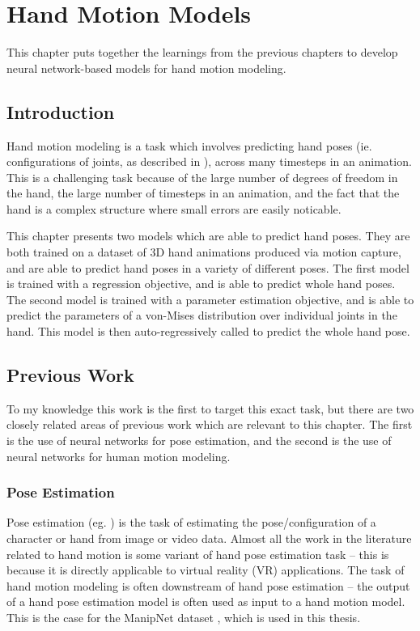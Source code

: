 \chapter{Hand Motion Models}
\label{C:hand-model}

This chapter puts together the learnings from the previous chapters to develop neural network-based models for hand motion modeling.

\section{Introduction}

Hand motion modeling is a task which involves predicting hand poses (ie. configurations of joints, as described in ), across many timesteps in an animation. This is a challenging task because of the large number of degrees of freedom in the hand, the large number of timesteps in an animation, and the fact that the hand is a complex structure where small errors are easily noticable.

This chapter presents two models which are able to predict hand poses. They are both trained on a dataset of 3D hand animations produced via motion capture, and are able to predict hand poses in a variety of different poses. The first model is trained with a regression objective, and is able to predict whole hand poses. The second model is trained with a parameter estimation objective, and is able to predict the parameters of a von-Mises distribution over individual joints in the hand. This model is then auto-regressively called to predict the whole hand pose.

\section{Previous Work}
\label{s:prev-work}

To my knowledge this work is the first to target this exact task, but there are two closely related areas of previous work which are relevant to this chapter. The first is the use of neural networks for pose estimation, and the second is the use of neural networks for human motion modeling.

\subsection{Pose Estimation}
\label{ss:pose-estimation}

Pose estimation (eg. \cite{real-time-hand-modeling}) is the task of estimating the pose/configuration of a character or hand from image or video data. Almost all the work in the literature related to hand motion is some variant of hand pose estimation task -- this is because it is directly applicable to virtual reality (VR) applications.  The task of hand motion modeling is often downstream of hand pose estimation -- the output of a hand pose estimation model is often used as input to a hand motion model. This is the case for the ManipNet dataset \cite{manipnet}, which is used in this thesis.

